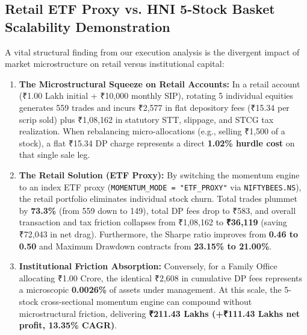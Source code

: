 \documentclass[11pt,a4paper]{article}
\begin{document}
\subsection{Retail ETF Proxy vs. HNI 5-Stock Basket Scalability Demonstration}

A vital structural finding from our execution analysis is the divergent impact of market microstructure on retail versus institutional capital:
\begin{enumerate}[leftmargin=*]
    \item \textbf{The Microstructural Squeeze on Retail Accounts:} In a retail account (₹1.00 Lakh initial + ₹10,000 monthly SIP), rotating 5 individual equities generates 559 trades and incurs ₹2,577 in flat depository fees (₹15.34 per scrip sold) plus ₹1,08,162 in statutory STT, slippage, and STCG tax realization. When rebalancing micro-allocations (e.g., selling ₹1,500 of a stock), a flat ₹15.34 DP charge represents a direct \textbf{1.02\% hurdle cost} on that single sale leg.
    \item \textbf{The Retail Solution (ETF Proxy):} By switching the momentum engine to an index ETF proxy (\texttt{MOMENTUM\_MODE = "ETF\_PROXY"} via \texttt{NIFTYBEES.NS}), the retail portfolio eliminates individual stock churn. Total trades plummet by \textbf{73.3\%} (from 559 down to 149), total DP fees drop to ₹583, and overall transaction and tax friction collapses from ₹1,08,162 to \textbf{₹36,119} (saving ₹72,043 in net drag). Furthermore, the Sharpe ratio improves from \textbf{0.46 to 0.50} and Maximum Drawdown contracts from \textbf{23.15\% to 21.00\%}.
    \item \textbf{Institutional Friction Absorption:} Conversely, for a Family Office allocating ₹1.00 Crore, the identical ₹2,608 in cumulative DP fees represents a microscopic \textbf{0.0026\%} of assets under management. At this scale, the 5-stock cross-sectional momentum engine can compound without microstructural friction, delivering \textbf{₹211.43 Lakhs (+₹111.43 Lakhs net profit, 13.35\% CAGR)}.
\end{enumerate}

\begin{table}[H]
\centering
{}
\caption{Retail ETF Proxy vs. HNI 5-Stock Basket Scalability Demonstration (In-Sample 2018--2023, Net of All Statutory Indian Costs).}
\end{table}
\end{document}
